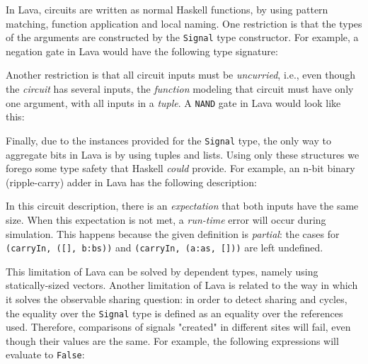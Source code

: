             In Lava, circuits are written as normal Haskell functions, by using pattern matching,
            function application and local naming.
            One restriction is that the types of the arguments are
            constructed by the \texttt{Signal} type constructor.
            For example, a negation gate in Lava would have the following type signature:


            Another restriction is that all circuit inputs must be \emph{uncurried}, i.e.,
            even though the \emph{circuit} has several inputs, the \emph{function} modeling that circuit
            must have only one argument, with all inputs in a \emph{tuple}.
            A \texttt{NAND} gate in Lava would look like this:


            Finally, due to the instances provided for the \texttt{Signal} type, the only way to
            aggregate bits in Lava is by using tuples and lists.
            Using only these structures we forego some type safety that Haskell \emph{could} provide.
            For example, an n-bit binary (ripple-carry) adder in Lava has the following description:

            \begin{center}
            \end{center}

            In this circuit description, there is an \emph{expectation} that both inputs have the same size.
            When this expectation is not met, a \emph{run-time} error will occur during simulation.
            This happens because the given definition is \emph{partial}: the cases for
            \texttt{(carryIn, ([], b:bs))} and \texttt{(carryIn, (a:as, []))} are left undefined.

            This limitation of Lava can be solved by dependent types, namely using statically-sized vectors.
            Another limitation of Lava is related to the way in which it solves the observable sharing question:
            in order to detect sharing and cycles, the equality over the \texttt{Signal} type is defined
            as an equality over the references used.
            Therefore, comparisons of signals "created" in different sites will fail,
            even though their values are the same.
            For example, the following expressions will evaluate to \texttt{False}:

